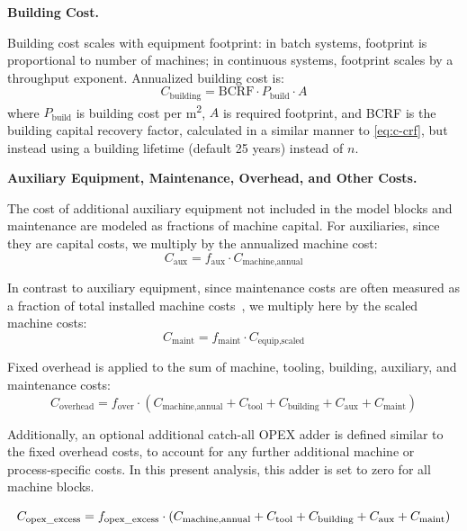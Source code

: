 \documentclass{article}
\renewcommand\_{\textunderscore\allowbreak}
\begin{document}
\medskip
\noindent\textbf{Building Cost.}\quad

Building cost scales with equipment footprint: in batch systems, footprint is proportional to number of machines; in continuous systems, footprint scales by a throughput exponent. Annualized building cost is:
\begin{equation}
    C_{\text{building}} = \text{BCRF} \cdot P_{\text{build}} \cdot A
\end{equation}
where $P_{\text{build}}$ is building cost per \si{m^2}, $A$ is required footprint, and BCRF is the building capital recovery factor, calculated in a similar manner to \ref{eq:c-crf}, but instead using a building lifetime (default 25 years) instead of $n$.

\medskip
\noindent\textbf{Auxiliary Equipment, Maintenance, Overhead, and Other Costs.}\quad

The cost of additional auxiliary equipment not included in the model blocks and maintenance are modeled as fractions of machine capital. For auxiliaries, since they are capital costs, we multiply by the annualized machine cost:
\begin{equation}
    C_{\text{aux}} = f_{\text{aux}} \cdot C_{\text{machine,annual}}
\end{equation}

In contrast to auxiliary equipment, since maintenance costs are often measured as a fraction of total installed machine costs~\cite{petersPlantDesignEconomics1991, ausimmMonograph27Cost}, we multiply here by the scaled machine costs:
\begin{equation}
    C_{\text{maint}} = f_{\text{maint}} \cdot C_{\text{equip,scaled}}
\end{equation}

Fixed overhead is applied to the sum of machine, tooling, building, auxiliary, and maintenance costs:
\begin{equation}
    C_{\text{overhead}} = f_{\text{over}} \cdot 
    (C_{\text{machine,annual}} + C_{\text{tool}} + C_{\text{building}} + C_{\text{aux}} + 
    C_{\text{maint}})
\end{equation}

Additionally, an optional additional catch-all OPEX adder is defined similar to the fixed overhead costs, to account for any further additional machine or process-specific costs. In this present analysis, this adder is set to zero for all machine blocks. 

\begin{equation}
    C_{\text{opex\_excess}} = f_{\text{opex\_excess}} \cdot 
    (C_{\text{machine,annual}} + C_{\text{tool}} + C_{\text{building}} + C_{\text{aux}} + 
    C_{\text{maint}})
\end{equation}
\end{document}
